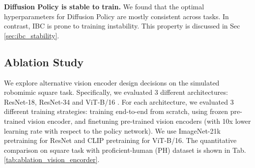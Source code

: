 \documentclass[Afour,sageh,times]{sagej}
\begin{document}


\textbf{Diffusion Policy is stable to train.}
We found that the optimal hyperparameters for Diffusion Policy are mostly consistent across tasks.  In contrast,  IBC \cite{ibc} is prone to training instability. This property is discussed in Sec \ref{sec:ibc_stability}.



\subsection{Ablation Study}
\label{sec:arch_ablation}
We explore alternative vision encoder design decisions on the simulated robomimic square task.
Specifically, we evaluated 3 different architectures: 
ResNet-18, ResNet-34 \cite{resnet} 
and ViT-B/16 \cite{dosovitskiy2020image}. 
For each architecture, we evaluated 3 different training strategies:
training end-to-end from scratch,
using frozen pre-trained vision encoder, 
and finetuning pre-trained vision encoders (with 10x lower learning rate with respect to the policy network).
We use ImageNet-21k \cite{ridnik2021imagenet21k} pretraining for ResNet and CLIP \cite{radford2021learning} pretraining for ViT-B/16.
The quantitative comparison on square task with proficient-human (PH) dataset is shown in Tab. \ref{tab:ablation_vision_encorder}.
\end{document}

